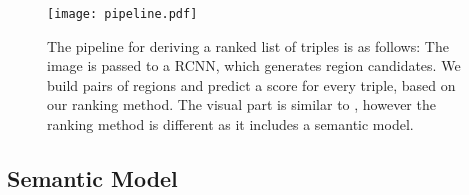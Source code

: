 \documentclass[runningheads,a4paper]{llncs}
\begin{document}
\begin{figure}[t]

\centering
\texttt{[image: pipeline.pdf]}
\caption{The pipeline for deriving a ranked list of triples is as follows: The image is passed to a RCNN, which generates region candidates. We build pairs of regions and predict a score for every triple, based on our ranking method. The visual part is similar to \cite{visual}, however the ranking method is different as it includes a semantic model.}
\label{fig_pipeline}
\end{figure}

\subsection{Semantic Model}
\label{section_model_semantic}

\end{document}
